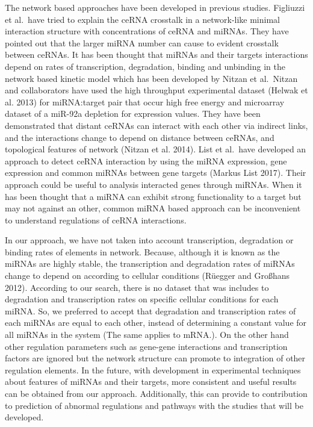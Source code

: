 \documentclass[]{article}
\begin{document}
The network based approaches have been developed in previous studies.
Figliuzzi et al.~have tried to explain the ceRNA crosstalk in a
network-like minimal interaction structure with concentrations of ceRNA
and miRNAs. They have pointed out that the larger miRNA number can cause
to evident crosstalk between ceRNAs. It has been thought that miRNAs and
their targets interactions depend on rates of transcription,
degradation, binding and unbinding in the network based kinetic model
which has been developed by Nitzan et al.~Nitzan and collaborators have
used the high throughput experimental dataset (Helwak et al. 2013) for
miRNA:target pair that occur high free energy and microarray dataset of
a miR-92a depletion for expression values. They have been demonstrated
that distant ceRNAs can interact with each other via indirect links, and
the interactions change to depend on distance between ceRNAs, and
topological features of network (Nitzan et al. 2014). List et al.~have
developed an approach to detect ceRNA interaction by using the miRNA
expression, gene expression and common miRNAs between gene targets
(Markus List 2017). Their approach could be useful to analysis
interacted genes through miRNAs. When it has been thought that a miRNA
can exhibit strong functionality to a target but may not against an
other, common miRNA based approach can be inconvenient to understand
regulations of ceRNA interactions.

In our approach, we have not taken into account transcription,
degradation or binding rates of elements in network. Because, although
it is known as the miRNAs are highly stable, the transcription and
degradation rates of miRNAs change to depend on according to cellular
conditions (Rüegger and Großhans 2012). According to our search, there
is no dataset that was includes to degradation and transcription rates
on specific cellular conditions for each miRNA. So, we preferred to
accept that degradation and transcription rates of each miRNAs are equal
to each other, instead of determining a constant value for all miRNAs in
the system (The same applies to mRNA.). On the other hand other
regulation parameters such as gene-gene interactions and transcription
factors are ignored but the network structure can promote to integration
of other regulation elements. In the future, with development in
experimental techniques about features of miRNAs and their targets, more
consistent and useful results can be obtained from our approach.
Additionally, this can provide to contribution to prediction of abnormal
regulations and pathways with the studies that will be developed.
\end{document}
